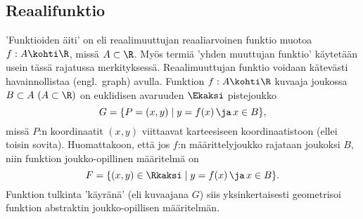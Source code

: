 \subsection*{Reaalifunktio}

'Funktioiden äiti' on  eli reaalimuuttujan reaaliarvoinen funktio muotoa
$f: A \kohti \R$, missä $A \subset \R$. Myös termiä 'yhden muuttujan funktio' käytetään usein 
tässä rajatussa merkityksessä. Reaalimuuttujan funktio voidaan kätevästi havainnollistaa
%
 (engl.\ graph) avulla. Funktion $f: A \kohti \R$ kuvaaja joukossa
$B \subset A\ (A\subset\R)$ on euklidisen avaruuden $\Ekaksi$ pistejoukko
\[ 
G = \{P = (x,y) \mid y = f(x)\,\ja\, x \in B\},
\]
missä $P$:n koordinaatit $(x,y)$ viittaavat karteesiseen koordinaatistoon (ellei toisin sovita).
Huomattakoon, että jos $f$:n määrittelyjoukko rajataan joukoksi $B$, niin funktion
joukko-opillinen määritelmä on
\[ 
F = \{(x,y)\in\Rkaksi \mid y = f(x)\,\ja\, x \in B\}.
\]
Funktion tulkinta 'käyränä' (eli kuvaajana $G$) siis yksinkertaisesti geometrisoi funktion
abstraktin joukko-opillisen määritelmän.

